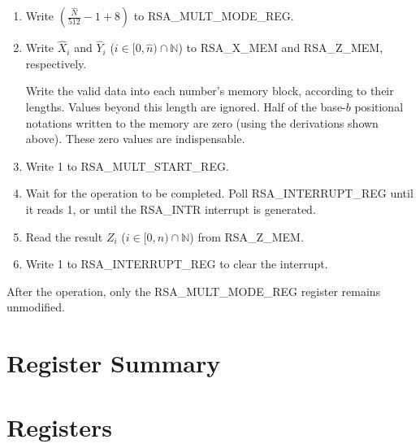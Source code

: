 \documentclass[main\_\_EN.tex]{subfiles}
\begin{document}
\begin{enumerate}

    \item Write \begin{math}( \frac{\hat{N}}{512} - 1 + 8 )\end{math} to RSA\_MULT\_MODE\_REG.

    \item Write
        \begin{math}\hat{X}_{i}\end{math} and
        \begin{math}\hat{Y}_{i}\end{math}
        (\begin{math}i \in [0,\hat{n}) \cap \mathbb{N}\end{math})
to RSA\_X\_MEM and RSA\_Z\_MEM, respectively.

     Write the valid data into each number's memory block, according to their lengths. Values beyond this length are ignored. Half of the base-\begin{math}b\end{math} positional notations written to the memory are zero (using the derivations shown above). These zero values are indispensable.

    \item Write 1 to RSA\_MULT\_START\_REG.

    \item Wait for the operation to be completed. Poll RSA\_INTERRUPT\_REG until it reads 1, or until the RSA\_INTR interrupt is generated.

    \item Read the result \begin{math}Z_{i}\end{math}
        (\begin{math}i \in [0,\hat{n}) \cap \mathbb{N}\end{math}) from  RSA\_Z\_MEM.

    \item Write 1 to RSA\_INTERRUPT\_REG to clear the interrupt.

\end{enumerate}

After the operation, only the RSA\_MULT\_MODE\_REG register remains unmodified.

\hypertarget{rsa-reg-summ}{}
\section{Register Summary}

{\clearpage}
\section{Registers}

\end{document}
